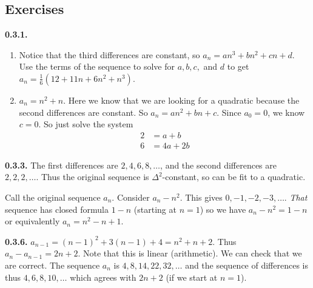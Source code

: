 \documentclass[10pt,]{book}
\theoremstyle{plain}
\theoremstyle{definition}
\theoremstyle{definition}
\theoremstyle{definition}
\theoremstyle{definition}
\numberwithin{equation}{chapter}
\newcommand{\amp}{&}
\begin{document}
\subsection*{ Exercises}
\noindent\textbf{0.3.1.} \hypertarget{p-262}{}%
\leavevmode%
\begin{enumerate}[label=(\alph*)]
\item\hypertarget{li-169}{}\hypertarget{p-263}{}%
Notice that the third differences are constant, so \(a_n = an^3 + bn^2 + cn + d\). Use the terms of the sequence to solve for \(a, b, c,\) and \(d\) to get \(a_n = \frac{1}{6} (12+11 n+6 n^2+n^3)\).%
\item\hypertarget{li-170}{}\(a_n = n^2 + n\).  Here we know that we are looking for a quadratic because the second differences are constant.  So \(a_n = an^2 + bn + c\).  Since \(a_0 = 0\), we know \(c= 0\).  So just solve the system%
\begin{align*}
2 \amp = a + b \\
6 \amp = 4a + 2b 
\end{align*}
%
\end{enumerate}
%
\par\smallskip
\noindent\textbf{0.3.3.} \hypertarget{p-266}{}%
The first differences are \(2, 4, 6, 8, \ldots\), and the second differences are \(2, 2, 2, \ldots\). Thus the original sequence is \(\Delta^2\)-constant, so can be fit to a quadratic.%
\par
\hypertarget{p-267}{}%
Call the original sequence \(a_n\). Consider \(a_n - n^2\). This gives \(0, -1, -2, -3, \ldots\). \emph{That} sequence has closed formula \(1-n\) (starting at \(n = 1\)) so we have \(a_n - n^2 = 1-n\) or equivalently \(a_n = n^2 - n + 1\).%
\par\smallskip
\noindent\textbf{0.3.6.} \hypertarget{p-277}{}%
\(a_{n-1} = (n-1)^2 + 3(n-1) + 4 = n^2 + n + 2\). Thus \(a_n - a_{n-1} = 2n+2\). Note that this is linear (arithmetic). We can check that we are correct. The sequence \(a_n\) is \(4, 8, 14, 22, 32, \ldots\) and the sequence of differences is thus \(4, 6, 8, 10,\ldots\) which agrees with \(2n+2\) (if we start at \(n = 1\)).%
\par\smallskip
\end{document}
